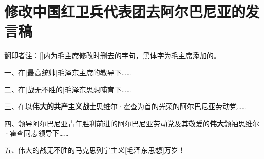 \section[修改中国红卫兵代表团去阿尔巴尼亚的发言稿（一九六七年六月）]{修改中国红卫兵代表团去阿尔巴尼亚的发言稿}


翻印者注：[]内为毛主席修改时删去的字句，黑体字为毛主席添加的。

一、在[最高统帅]毛泽东主席的教导下……

二、在[战无不胜的]毛泽东思想哺育下……

三、在以\textbf{伟大的共产主义战士}思维尔·霍查为首的光荣的阿尔巴尼亚劳动党……

四、领导阿尔巴尼亚青年胜利前进的阿尔巴尼亚劳动党及其敬爱的\textbf{伟大}领袖思维尔·霍查同志领导下……

五、伟大的战无不胜的马克思列宁主义[毛泽东思想]万岁！

